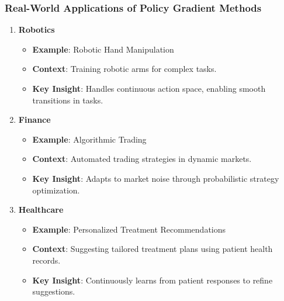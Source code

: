 \documentclass{beamer}
\begin{document}
\begin{frame}[fragile]
    \frametitle{Real-World Applications of Policy Gradient Methods}
    \begin{enumerate}
        \item \textbf{Robotics}
            \begin{itemize}
                \item \textbf{Example}: Robotic Hand Manipulation
                \item \textbf{Context}: Training robotic arms for complex tasks.
                \item \textbf{Key Insight}: Handles continuous action space, enabling smooth transitions in tasks.
            \end{itemize}
        
        \item \textbf{Finance}
            \begin{itemize}
                \item \textbf{Example}: Algorithmic Trading
                \item \textbf{Context}: Automated trading strategies in dynamic markets.
                \item \textbf{Key Insight}: Adapts to market noise through probabilistic strategy optimization.
            \end{itemize}
        
        \item \textbf{Healthcare}
            \begin{itemize}
                \item \textbf{Example}: Personalized Treatment Recommendations
                \item \textbf{Context}: Suggesting tailored treatment plans using patient health records.
                \item \textbf{Key Insight}: Continuously learns from patient responses to refine suggestions.
            \end{itemize}
    \end{enumerate}
\end{frame}
\end{document}
